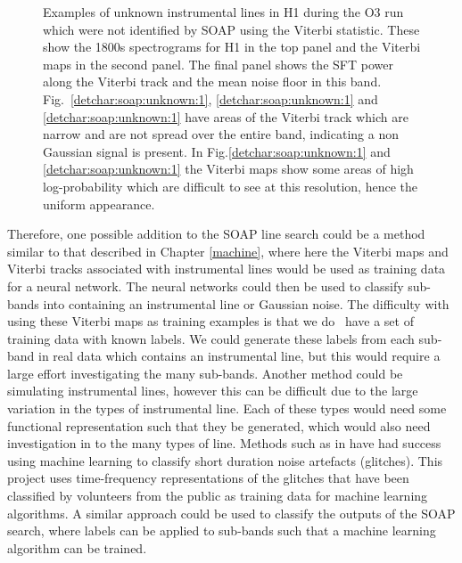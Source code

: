 \begin{figure}[hpt]
	\caption[lines from unknown sources]{Examples of unknown instrumental lines in H1 during the O3 run which were not identified by SOAP using the Viterbi statistic. These show the 1800s spectrograms for H1 in the top panel and the Viterbi maps in the second panel. The final panel shows the \gls{SFT} power along the Viterbi track and the mean noise floor in this band.  Fig.~\ref{detchar:soap:unknown:1}, \ref{detchar:soap:unknown:1} and \ref{detchar:soap:unknown:1} have areas of the Viterbi track which are narrow and are not spread over the entire band, indicating a non Gaussian signal is present. In Fig.\ref{detchar:soap:unknown:1} and \ref{detchar:soap:unknown:1} the Viterbi maps show some areas of high log-probability which are difficult to see at this resolution, hence the uniform appearance. }
	\label{detchar:soap:unknown}
\end{figure}
%

Therefore, one possible addition to the SOAP line search could be a method similar to that described in Chapter \ref{machine}, where here the Viterbi maps and Viterbi tracks associated with instrumental lines would be used as training data for a neural network. 
The neural networks could then be used to classify sub-bands into containing an instrumental line or Gaussian noise.
The difficulty with using these Viterbi maps as training examples is that we
do~ have a set of training data with known labels. 
We could generate these labels from each sub-band in real data which contains an instrumental line, but this would require a large effort investigating the many sub-bands. Another method could be simulating instrumental lines, however this can be difficult due to the large variation in the types of instrumental line. Each of these types would need some functional representation such that they be generated, which would also need investigation in to the many types of line.
Methods such as in \citep{zevin2017GravitySpy} have had success using machine learning to classify short duration noise artefacts (glitches). This project uses time-frequency representations of the glitches that have been classified by volunteers from the public as training data for machine learning algorithms.
A similar approach could be used to classify the outputs of the SOAP search, where labels can be applied to sub-bands such that a machine learning algorithm can be trained.
~

